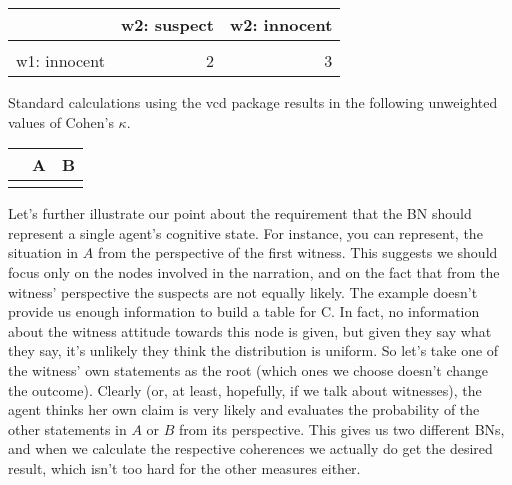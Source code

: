 \documentclass[10pt,]{scrartcl}
\begin{document}
\begin{table}[H]
\centering
\begin{tabular}{lrr}
\toprule
  & w2: suspect & w2: innocent\\
\midrule
\cellcolor{gray!6}{w1: suspect} & \cellcolor{gray!6}{1} & \cellcolor{gray!6}{2}\\
w1: innocent & 2 & 3\\
\bottomrule
\end{tabular}
\end{table}

\noindent Standard calculations using the \textsf{vcd} package results
in the following unweighted values of Cohen's \(\kappa\).

\begin{table}[H]
\centering
\begin{tabular}{lrr}
\toprule
  & A & B\\
\midrule
\cellcolor{gray!6}{value} & \cellcolor{gray!6}{0.467} & \cellcolor{gray!6}{-0.067}\\
\bottomrule
\end{tabular}
\end{table}

Let's further illustrate our point about the requirement that the BN
should represent a single agent's cognitive state. For instance, you can
represent, the situation in \(A\) from the perspective of the first
witness. This suggests we should focus only on the nodes involved in the
narration, and on the fact that from the witness' perspective the
suspects are not equally likely. The example doesn't provide us enough
information to build a table for \textsf{C}. In fact, no information
about the witness attitude towards this node is given, but given they
say what they say, it's unlikely they think the distribution is uniform.
So let's take one of the witness' own statements as the root (which ones
we choose doesn't change the outcome). Clearly (or, at least, hopefully,
if we talk about witnesses), the agent thinks her own claim is very
likely and evaluates the probability of the other statements in \(A\) or
\(B\) from its perspective. This gives us two different BNs, and when we
calculate the respective coherences we actually do get the desired
result, which isn't too hard for the other measures either.
\end{document}
